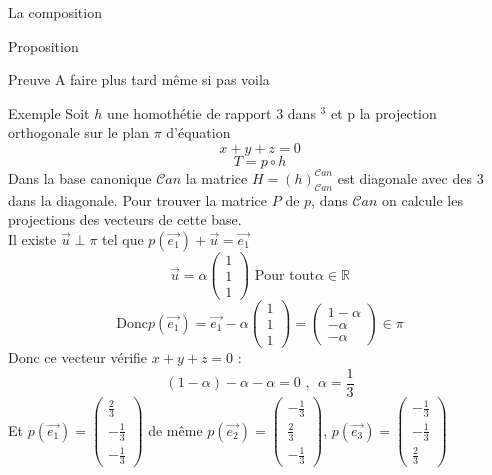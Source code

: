 \begin{parag}{La composition}
\begin{subparag}{Proposition}
    \end{subparag}
    \begin{subparag}{Preuve}
        A faire plus tard même si pas voila
    \end{subparag}
    \begin{subparag}{Exemple}
        Soit $h$ une homothétie de rapport $3$ dans \R$^3$ et p la projection orthogonale sur le plan $\pi$ d'équation
        \[x + y + z = 0\]
        \[T = p \circ h\]
        Dans la base canonique $\mathcal{C}an$ la matrice $H = (h)_{\mathcal{C}an}^{\mathcal{C}an}$ est diagonale avec des $3$ dans la diagonale. Pour trouver la matrice $P$ de $p$, dans $\mathcal{C}an$ on calcule les projections des vecteurs de cette base.\\
        Il existe $\vec{u}\perp \pi$ tel que $p(\vec{e_1}) + \vec{u} = \vec{e_1}$
        \[\vec{u} = \alpha\begin{pmatrix}
            1 \\ 1 \\ 1
        \end{pmatrix} \text{ Pour tout} \alpha \in \mathbb{R}\]
        \[\text{Donc} p(\vec{e_1}) = \vec{e_1} - \alpha \begin{pmatrix}
            1 \\ 1 \\ 1
        \end{pmatrix} = \begin{pmatrix}
            1 - \alpha \\ -\alpha \\ -\alpha 
        \end{pmatrix} \in \pi\]
        Donc ce vecteur vérifie $x + y + z = 0$ :
        \[(1 - \alpha) - \alpha - \alpha = 0 \text{ , } \; \alpha = \frac{1}{3}    \]
        Et $p(\vec{e_1}) = \begin{pmatrix}
            \frac{2}{3} \\ -\frac{1}{3} \\ -\frac{1}{3}
        \end{pmatrix}$ de même $p(\vec{e_2}) = \begin{pmatrix}
            -\frac{1}{3} \\ \frac{2}{3} \\ -\frac{1}{3}
        \end{pmatrix}$, $p(\vec{e_3}) = \begin{pmatrix}
            -\frac{1}{3} \\ - \frac{1}{3} \\ \frac{2}{3} 
        \end{pmatrix}$

\end{subparag}
\end{parag}
